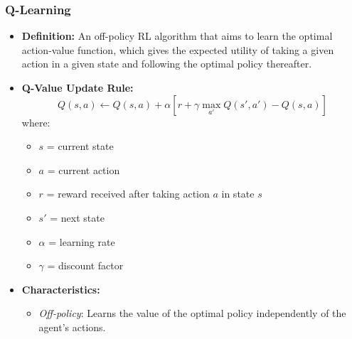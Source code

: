 \documentclass[8pt]{article}
\begin{document}
\subsubsection*{Q-Learning}
\begin{itemize}
    \item \textbf{Definition:} An off-policy RL algorithm that aims to learn the optimal action-value function, which gives the expected utility of taking a given action in a given state and following the optimal policy thereafter.
    \item \textbf{Q-Value Update Rule:}
    \[
    Q(s, a) \leftarrow Q(s, a) + \alpha \left[ r + \gamma \max_{a'} Q(s', a') - Q(s, a) \right]
    \]
    where:
    \begin{itemize}
        \item \( s \) = current state
        \item \( a \) = current action
        \item \( r \) = reward received after taking action \( a \) in state \( s \)
        \item \( s' \) = next state
        \item \( \alpha \) = learning rate
        \item \( \gamma \) = discount factor
    \end{itemize}
    \item \textbf{Characteristics:}
    \begin{itemize}
        \item \textit{Off-policy}: Learns the value of the optimal policy independently of the agent's actions.
    \end{itemize}
\end{itemize}
\end{document}
